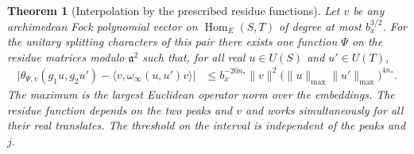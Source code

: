 \documentclass[a4paper,11pt]{article}
\newtheorem{theorem}[proposition]{Theorem}
\theoremstyle{definition}
\theoremstyle{remark}
\numberwithin{equation}{section}
\begin{document}
\begin{theorem}[Interpolation by the prescribed residue functions]
\leavevmode\label{thm:sparseapprox814}
Let \(v\) be any archimedean Fock polynomial vector on
\(\operatorname{Hom}_E(S,T)\) of degree at most \(b_x^{3/2}\).
For the unitary splitting characters of this pair there
exists one function \(\Psi\) on the residue matrices
modulo \(\mathfrak a^2\) such that, for all real \(u\in U(S)\)
and \(u'\in U(T)\),
\[
\begin{split}
 \big|\theta_{\Psi,v}(g_1u,g_2u')
       -\langle v,\omega_\infty(u,u')v\rangle\big|
 &\le b_x^{-20n_*}\|v\|^2
           \bigl(\|u\|_{\max}\|u'\|_{\max}\bigr)^{4n_*}.
\end{split}
\]
The maximum is the largest Euclidean operator norm over
the embeddings. The residue function depends on the two
peaks and \(v\) and works simultaneously for all their
real translates. The threshold on the interval is
independent of the peaks and \(j\).
\end{theorem}
\end{document}
